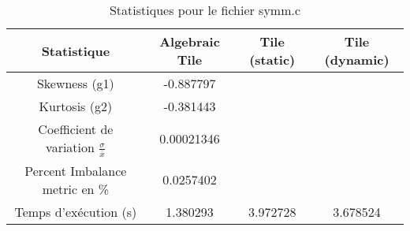 \documentclass{article}
\begin{document}
\begin{table}[htbp]
  \centering
  \caption{Statistiques pour le fichier symm.c}
  \begin{tabular}{|c|c|c|c|}
    \hline
    Statistique & Algebraic Tile & Tile (static) & Tile (dynamic) \\ 
    \hline
    Skewness (g1) & -0.887797 &  &  \\ 
    Kurtosis (g2) & -0.381443 &  &  \\ 
    Coefficient de variation $ \frac{\sigma}{\overline{x}} $ & 0.00021346 &  & \\ 
    Percent Imbalance metric en \% & 0.0257402 &  & \\ 
    Temps d'exécution (s) &  1.380293    &  3.972728   &  3.678524   \\ 
    \hline
  \end{tabular}
\end{table}
\newpage
\end{document}
